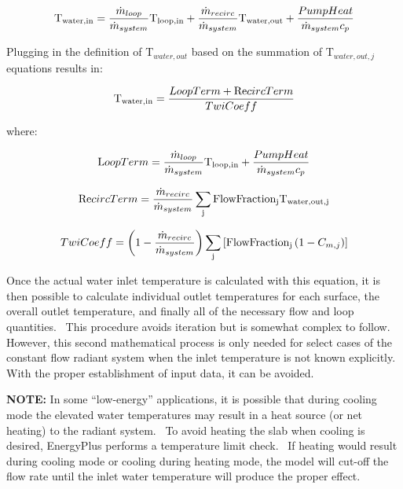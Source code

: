 \begin{equation}
{{\rm{T}}_{{\rm{water,in}}}} = \frac{{{{\dot m}_{loop}}}}{{{{\dot m}_{system}}}}{{\rm{T}}_{{\rm{loop,in}}}} + \frac{{{{\dot m}_{recirc}}}}{{{{\dot m}_{system}}}}{{\rm{T}}_{{\rm{water,out}}}} + \frac{{PumpHeat}}{{{{\dot m}_{system}}{c_p}}}
\end{equation}

Plugging in the definition of T\(_{water,out}\) based on the summation of T\(_{water,out,j}\) equations results in:

\begin{equation}
{{\rm{T}}_{{\rm{water,in}}}} = \frac{{LoopTerm + {\mathop{\rm Re}\nolimits} circTerm}}{{TwiCoeff}}
\end{equation}

where:

\begin{equation}
{\rm{L}}oopTerm = \frac{{{{\dot m}_{loop}}}}{{{{\dot m}_{system}}}}{{\rm{T}}_{{\rm{loop,in}}}} + \frac{{PumpHeat}}{{{{\dot m}_{system}}{c_p}}}
\end{equation}

\begin{equation}
{\mathop{\rm Re}\nolimits} circTerm = \frac{{{{\dot m}_{recirc}}}}{{{{\dot m}_{system}}}}\sum\limits_{\rm{j}} {{\rm{FlowFractio}}{{\rm{n}}_{\rm{j}}}{{\rm{T}}_{{\rm{water,out,j}}}}}
\end{equation}

\begin{equation}
TwiCoeff = \left( {1 - \frac{{{{\dot m}_{recirc}}}}{{{{\dot m}_{system}}}}} \right)\sum\limits_{\rm{j}} {\left[ {{\rm{FlowFractio}}{{\rm{n}}_{\rm{j}}}\left( {1 - {C_{m,j}}} \right)} \right]}
\end{equation}

Once the actual water inlet temperature is calculated with this equation, it is then possible to calculate individual outlet temperatures for each surface, the overall outlet temperature, and finally all of the necessary flow and loop quantities.~ This procedure avoids iteration but is somewhat complex to follow.~ However, this second mathematical process is only needed for select cases of the constant flow radiant system when the inlet temperature is not known explicitly.~ With the proper establishment of input data, it can be avoided.

\textbf{NOTE:} In some ``low-energy'' applications, it is possible that during cooling mode the elevated water temperatures may result in a heat source (or net heating) to the radiant system.~ To avoid heating the slab when cooling is desired, EnergyPlus performs a temperature limit check.~ If heating would result during cooling mode or cooling during heating mode, the model will cut-off the flow rate until the inlet water temperature will produce the proper effect.

